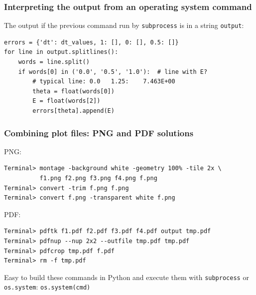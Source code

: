 \documentclass{beamer}
\begin{document}
\begin{frame}
\frametitle{Interpreting the output from an operating system command}

The output if the previous command run by \texttt{subprocess} is in a string
\texttt{output}:

\begin{verbatim}
errors = {'dt': dt_values, 1: [], 0: [], 0.5: []}
for line in output.splitlines():
    words = line.split()
    if words[0] in ('0.0', '0.5', '1.0'):  # line with E?
        # typical line: 0.0   1.25:    7.463E+00
        theta = float(words[0])
        E = float(words[2])
        errors[theta].append(E)
\end{verbatim}
\end{frame}

\begin{frame}
\frametitle{Combining plot files: PNG and PDF solutions}

PNG:

\begin{verbatim}
Terminal> montage -background white -geometry 100% -tile 2x \ 
          f1.png f2.png f3.png f4.png f.png
Terminal> convert -trim f.png f.png
Terminal> convert f.png -transparent white f.png
\end{verbatim}

PDF:

\begin{verbatim}
Terminal> pdftk f1.pdf f2.pdf f3.pdf f4.pdf output tmp.pdf
Terminal> pdfnup --nup 2x2 --outfile tmp.pdf tmp.pdf
Terminal> pdfcrop tmp.pdf f.pdf
Terminal> rm -f tmp.pdf
\end{verbatim}

Easy to build these commands in Python and execute them with \texttt{subprocess}
or \texttt{os.system}: \texttt{os.system(cmd)}
\end{frame}
\end{document}
